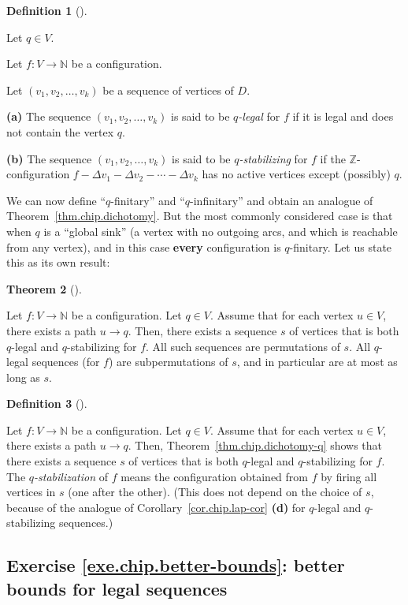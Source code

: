 \documentclass[numbers=enddot,12pt,final,onecolumn,notitlepage]{scrartcl}%
\theoremstyle{definition}
\newtheorem{theo}{Theorem}[section]
\newenvironment{theorem}[1][]
{\begin{theo}[#1]\begin{leftbar}}
{\end{leftbar}\end{theo}}
\newtheorem{defi}[theo]{Definition}
\newenvironment{definition}[1][]
{\begin{defi}[#1]\begin{leftbar}}
{\end{leftbar}\end{defi}}
\newcommand{\NN}{\mathbb{N}}
\newcommand{\ZZ}{\mathbb{Z}}
\newcommand{\tup}[1]{\left( #1 \right)}
\begin{document}
\begin{definition}
Let $q \in V$.

Let $f : V \to \NN$ be a configuration.

Let $\tup{v_1, v_2, \ldots, v_k}$ be a sequence of vertices of
$D$.

\textbf{(a)} The sequence $\tup{v_1, v_2, \ldots, v_k}$ is said
to be \textit{$q$-legal} for $f$ if it is legal and does not
contain the vertex $q$.

\textbf{(b)} The sequence $\tup{v_1, v_2, \ldots, v_k}$ is said
to be \textit{$q$-stabilizing} for $f$ if the $\ZZ$-configuration
$f - \Delta v_1 - \Delta v_2 - \cdots - \Delta v_k$ has no
active vertices except (possibly) $q$.
\end{definition}

We can now define ``$q$-finitary'' and ``$q$-infinitary''
and obtain an analogue of Theorem~\ref{thm.chip.dichotomy}.
But the most commonly considered case is that when $q$ is
a ``global sink'' (a vertex with no outgoing arcs, and which
is reachable from any vertex),
and in this case \textbf{every} configuration is
$q$-finitary.
Let us state this as its own result:

\begin{theorem} \label{thm.chip.dichotomy-q}
Let $f : V \to \NN$ be a configuration.
Let $q \in V$.
Assume that for each vertex $u \in V$, there exists a path
$u \to q$.
Then, there exists a sequence $s$ of vertices that is both
$q$-legal and $q$-stabilizing for $f$.
All such sequences are permutations of $s$.
All $q$-legal sequences (for $f$) are subpermutations
of $s$, and in particular are at most as long as $s$.
\end{theorem}

\begin{definition}
Let $f : V \to \NN$ be a configuration.
Let $q \in V$.
Assume that for each vertex $u \in V$, there exists a path
$u \to q$.
Then, Theorem~\ref{thm.chip.dichotomy-q} shows that
there exists a sequence $s$ of vertices that is both
$q$-legal and $q$-stabilizing for $f$.
The \textit{$q$-stabilization} of $f$ means
the configuration obtained from $f$ by firing
all vertices in $s$ (one after the other).
(This does not depend on the choice of $s$, because of
the analogue of
Corollary~\ref{cor.chip.lap-cor} \textbf{(d)}
for $q$-legal and $q$-stabilizing sequences.)
\end{definition}


\subsection{Exercise \ref{exe.chip.better-bounds}: better
bounds for legal sequences}
\end{document}
